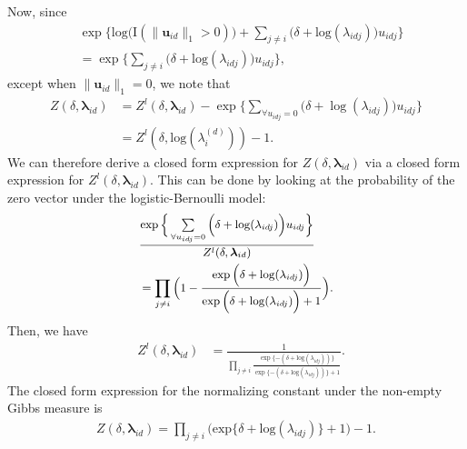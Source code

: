 \documentclass[twoside]{article}
\begin{document}
  	 Now, since 
  	 \begin{equation*}
  	 \begin{aligned}
  	 &\exp\Big\{ \mbox{log}\Big(\text{I}(\lVert \boldsymbol{u}_{id} \rVert_1 > 0)\Big) + \sum_{j \neq i} \Big(\delta+\mbox{log}(\lambda_{idj})\Big)u_{idj} \Big\}\\&= \exp\Big\{  \sum_{j \neq i} \Big(\delta+\mbox{log}(\lambda_{idj})\Big)u_{idj} \Big\},
\end{aligned}
 	 \end{equation*}
 	  except when $\lVert \boldsymbol{u}_{id} \rVert_1=0$, we note that 
  	 \begin{equation*}
  	 \begin{aligned}
  	 Z(\delta,\boldsymbol{\lambda}_{id})& = Z^{l}(\delta,\boldsymbol{\lambda}_{id}) -  \exp\Big\{ \sum\limits_{\forall u_{idj}=0}\Big(\delta+\log(\lambda_{idj})\Big)u_{idj} \Big\}
  	 \\& = Z^{l}(\delta,\mbox{log}(\lambda_{i}^{(d)})) -  1.
  	 \end{aligned}
  	 \end{equation*}
  	 We can therefore derive a closed form expression for $Z(\delta,\boldsymbol{\lambda}_{id})$ via a closed form expression for $Z^{l}(\delta,\boldsymbol{\lambda}_{id})$. This can be done by looking at the probability of the zero vector under the logistic-Bernoulli model:
  	 \begin{equation*}
  	 \footnotesize
  	 \begin{aligned}
  	 &\frac{\exp\Big\{ \sum\limits_{\forall u_{idj}=0}\Big(\delta+\log(\lambda_{idj})\Big)u_{idj} \Big\}}{Z^{l}(\delta,\boldsymbol{\lambda}_{id})}\\&= \prod_{j \neq i}   \Big(1-\frac{ \exp{\Big(\delta+\log(\lambda_{idj})\Big)}}{\exp{\Big(\delta+\log(\lambda_{idj})\Big)} + 1}\Big).
  	  \end{aligned}  
  	  \end{equation*}
  	  Then, we have 
  	    	 \begin{equation*}
  	    	 \begin{aligned}
  	& Z^{l}(\delta,\boldsymbol{\lambda}_{id}) &= \frac{1}{\prod\limits_{j \neq i}   \frac{ \exp\{-(\delta+\mbox{log}(\lambda_{idj}))\}}{\exp\{-(\delta+\mbox{log}(\lambda_{idj}))\} + 1}}.
  	 \end{aligned}  
  	 \end{equation*}
  	 The closed form expression for the normalizing constant under the non-empty Gibbs measure is  \begin{equation*}
  	 \begin{aligned}Z(\delta,\boldsymbol{\lambda}_{id}) = \prod_{j \neq i } \Big(\mbox{exp}\{\delta+\mbox{log}(\lambda_{idj})\} + 1\Big)-1.
  	 \end{aligned}  
  	 \end{equation*}
  	
\end{document}
